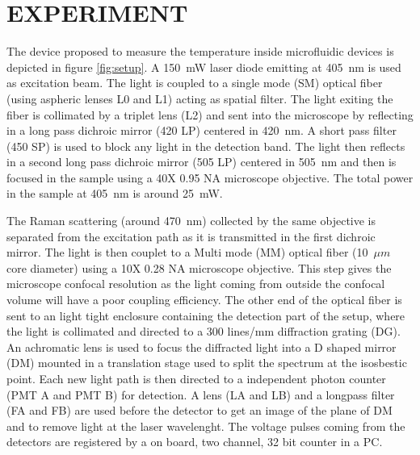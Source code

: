\documentclass[]{spie}  %
\begin{document}
\section{EXPERIMENT}

The device proposed to measure the temperature inside microfluidic devices is depicted in figure \ref{fig:setup}. A 150~mW laser diode emitting at 405~nm is used as excitation beam. The light is coupled to a single mode (SM) optical fiber (using aspheric lenses L0 and L1) acting as spatial filter. The light exiting the fiber is collimated by a triplet lens (L2) and sent into the microscope by reflecting in a long pass dichroic mirror (420 LP) centered in 420~nm. A short pass filter (450 SP) is used to block any light in the detection band. The light then reflects in a second long pass dichroic mirror (505 LP) centered in 505~nm and then is focused in the sample using a 40X 0.95 NA microscope objective. The total power in the sample at 405~nm is around 25~mW. 

The Raman scattering (around 470~nm) collected by the same objective is separated from the excitation path as it is transmitted in the first dichroic mirror. The light is then couplet to a Multi mode (MM) optical fiber (10~$\mu m$ core diameter) using a 10X 0.28 NA microscope objective. This step gives the microscope confocal resolution as the light coming from outside the confocal volume will have a poor coupling efficiency. The other end of the optical fiber is sent to an light tight enclosure containing the detection part of the setup, where the light is collimated and directed to a 300 lines/mm diffraction grating (DG). An achromatic lens is used to focus the diffracted light into a D shaped mirror (DM) mounted in a translation stage used to split the spectrum at the isosbestic point. Each new light path is then directed to a independent photon counter (PMT A and PMT B) for detection. A lens (LA and LB) and a longpass filter (FA and FB) are used before the detector to get an image of the plane of DM and to remove light at the laser wavelenght. The voltage pulses coming from the detectors are registered by a on board, two channel, 32 bit counter in a PC.  
\end{document}
